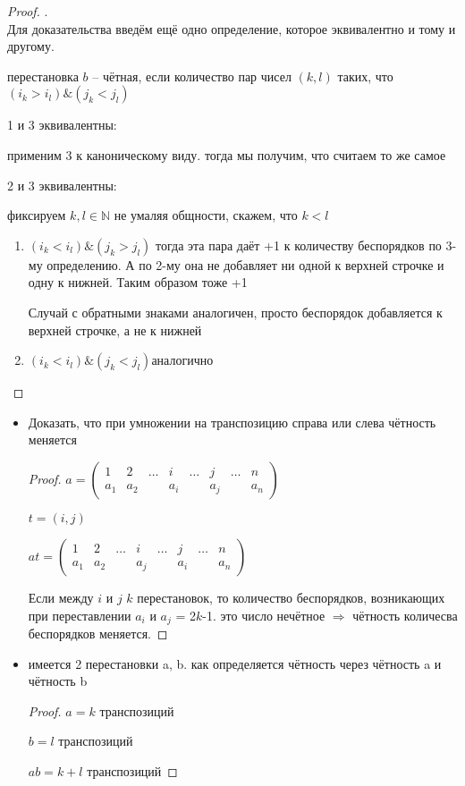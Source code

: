 \documentclass[11pt,a4paper]{book}
\begin{document}
\begin{proof}
.\\
	Для доказательства введём ещё одно определение, которое эквивалентно и тому и другому.
	
	перестановка $b$ -- чётная, если количество пар чисел $(k, l)$ таких, что $(i_k>i_l)\&(j_k<j_l)$ 
	
	1 и 3 эквивалентны:

	применим 3 к каноническому виду. тогда мы получим, что считаем то же самое
	
	2 и 3 эквивалентны:
	
	фиксируем $k, l \in \mathds{N}$  не умаляя общности, скажем, что $k<l$
	
	\begin{enumerate}
		\item $(i_k<i_l) \& (j_k>j_l)$ тогда эта пара даёт +1 к количеству беспорядков по 3-му определению. А по 2-му она не добавляет ни одной к верхней строчке и одну к нижней. Таким образом тоже +1
		
		Случай с обратными знаками аналогичен, просто беспорядок добавляется к верхней строчке, а не к нижней
		\item $(i_k<i_l) \& (j_k<j_l)$аналогично
	\end{enumerate}	 
\end{proof}

\begin{itemize}
	\item Доказать, что при умножении на транспозицию справа или слева чётность меняется
	\begin{proof}
		$a =
	\begin{pmatrix}
		1 & 2 & \hdots & i & \hdots & j & \hdots &n\\
		a_1 & a _2 & & a_i & & a_j & & a_n
	\end{pmatrix}$
		
	$t = (i, j)$
	
	$at =
	\begin{pmatrix}
		1 & 2 & \hdots & i & \hdots & j & \hdots &n\\
		a_1 & a _2 & & a_j & & a_i & & a_n
	\end{pmatrix}$
	
	Если между $i$ и $j$  $k$ перестановок, то количество беспорядков, возникающих при переставлении $a_i$ и $a_j$ = 2$k$-1. это число нечётное $\Rightarrow$ чётность количесва беспорядков меняется.
	\end{proof}
	\item имеется 2 перестановки a, b. как определяется чётность через чётность a и чётность b
	\begin{proof}
		$a = k$ транспозиций
		
		$b = l$ транспозиций
		
		$ab = k+l$ транспозиций
	\end{proof}
\end{itemize}
\end{document}
